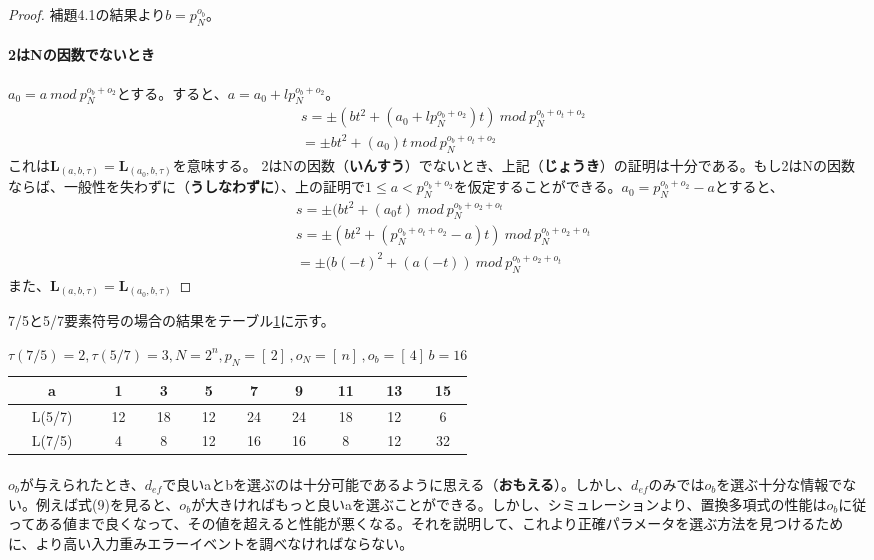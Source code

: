 \documentclass[24 pts]{article}
\begin{document}
\begin{proof}
補題4.1の結果より$b=p_N^{o_{b}}$。\paragraph{2はNの因数でないとき}$a_0=a\ mod \ p_N^{o_{b}+o_{2}}$とする。すると、$a=a_0+lp_N^{o_{b}+o_{2}}$。
\begin{equation}\tag{11}
\begin{split}
&s=\pm ({b}t^2 + (a_0+lp_N^{o_{b}+o_{2}})t)\ mod \ p_N^{o_b+o_t+o_2}\\
&=\pm {b}t^2 + (a_0)t\ mod \ p_N^{o_b+o_t+o_2}
\end{split}
\end{equation}
これは$\mathbf{L}_(a,b,\tau)=\mathbf{L}_(a_0,b,\tau)$を意味する。
2はNの因数（\textbf{いんすう}）でないとき、上記（\textbf{じょうき}）の証明は十分である。もし2はNの因数ならば、一般性を失わずに（\textbf{うしなわずに}）、上の証明で$1 \leq a < p_N^{o_b+o_2}$を仮定することができる。$a_0=p_N^{o_b+o_2}-a$とすると、
\begin{equation}\tag{12}
\begin{split}
&s=\pm ({b}t^2 + (a_0t)\ mod \ p_N^{o_b+o_2+o_t}\\
&s=\pm ({b}t^2 + (p_N^{o_b+o_t+o_2}-a)t)\ mod \ p_N^{o_b+o_2+o_t}\\
&=\pm (b(-t)^2 +(a(-t))\ mod \ p_N^{o_b+o_2+o_t}
\end{split}
\end{equation}
また、$\mathbf{L}_(a,b,\tau)=\mathbf{L}_(a_0,b,\tau)$
\end{proof}
7/5と5/7要素符号の場合の結果をテーブル\ref{テーブル:１}に示す。
\begin{table}[h!]
\begin{center}
\begin{tabular}{|c|c|c|c|c|c|c|c|c|}
\hline
a & 1 & 3 & 5 & 7 & 9 & 11 & 13 & 15 \\
\hline
L(5/7) & 12 & 18 & 12 & 24 & 24 & 18 & 12 & 6 \\
\hline
L(7/5) & 4 & 8 & 12 & 16 & 16 & 8 & 12 & 32 \\
\hline
\end{tabular}
\caption{$\tau(7/5) =2,\tau(5/7) =3,N=2^n,p_N=[\, 2]\,,o_N=[\, n]\,,o_b=[\, 4]\,b=16$}
\label{テーブル:１}
\end{center}
\end{table}
\paragraph{}
$o_b$が与えられたとき、$d_{ef}$で良いaとbを選ぶのは十分可能であるように思える（\textbf{おもえる}）。しかし、$d_{ef}$のみでは$o_b$を選ぶ十分な情報でない。例えば式(9)を見ると、$o_b$が大きければもっと良いaを選ぶことができる。しかし、シミュレーションより、置換多項式の性能は$o_b$に従ってある値まで良くなって、その値を超えると性能が悪くなる。それを説明して、これより正確パラメータを選ぶ方法を見つけるために、より高い入力重みエラーイベントを調べなければならない。
\end{document}
